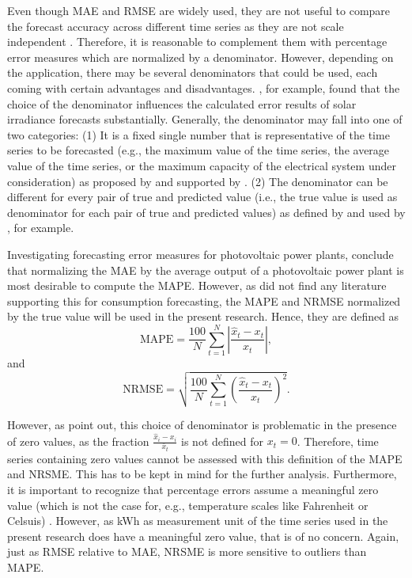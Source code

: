 Even though MAE and RMSE are widely used, they are not useful to compare the forecast accuracy across different time series as they are not scale independent \citep{Meer:2018}. Therefore, it is reasonable to complement them with percentage error measures which are normalized by a denominator. However, depending on the application, there may be several denominators that could be used, each coming with certain advantages and disadvantages. \citet{Hoff:2013}, for example, found that the choice of the denominator influences the calculated error results of solar irradiance forecasts substantially. Generally, the denominator may fall into one of two categories: (1) It is a fixed single number that is representative of the time series to be forecasted (e.g., the maximum value of the time series, the average value of the time series, or the maximum capacity of the electrical system under consideration) as proposed by \citet{Hoff:2013} and supported by \citet{Meer:2018}. (2) The denominator can be different for every pair of true and predicted value (i.e., the true value is used as denominator for each pair of true and predicted values) as defined by \citet{Hyndman:2006} and used by \citet{xie:2018}, for example. 

Investigating forecasting error measures for photovoltaic power plants, \citet{Hoff:2013} conclude that normalizing the MAE by the average output of a photovoltaic power plant is most desirable to compute the MAPE. However, as \citet{Meer:2018} did not find any literature supporting this for consumption forecasting, the MAPE and NRMSE normalized by the true value will be used in the present research. Hence, they are defined as
%
\begin{equation} \label{Eq:MAPE}
\text{MAPE}=\frac{100}{N}\sum_{t=1}^N\left|\frac{\widehat{x}_t-x_t}{x_t}\right|,
\end{equation}
and
\begin{equation} \label{Eq:NRMSE}
\text{NRMSE}=\sqrt{\frac{100}{N}\sum_{t=1}^N\left(\frac{\widehat{x}_t-x_t}{x_t}\right)^2}.
\end{equation}

\noindent However, as \citet{Hyndman:2006} point out, this choice of denominator is problematic in the presence of zero values, as the fraction $\frac{\widehat{x}_i-x_i}{\bar{x}_t}$ is not defined for $x_t=0$. Therefore, time series containing zero values cannot be assessed with this definition of the MAPE and NRSME. This has to be kept in mind for the further analysis. Furthermore, it is important to recognize that percentage errors assume a meaningful zero value (which is not the case for, e.g., temperature scales like Fahrenheit or Celsuis) \citep{Hyndman:2006}. However, as kWh as measurement unit of the time series used in the present research does have a meaningful zero value, that is of no concern. Again, just as RMSE relative to MAE, NRSME is more sensitive to outliers than MAPE.


